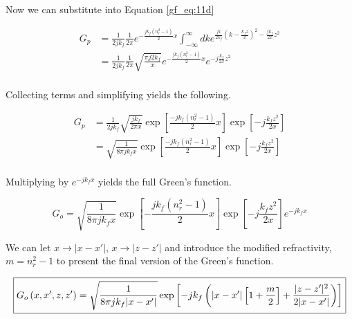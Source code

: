 \noindent Now we can substitute into Equation \ref{gf_eq:11d}

\begin{equation}
\begin{aligned}
G_p &= \frac{1}{2jk_f}\frac{1}{2\pi}e^{-\frac{jk_f(n_r^2-1)}{2}x}\int_{-\infty}^{\infty}dk e^{\frac{jx}{2k_f}\left(k  -\frac{k_fz}{x}\right)^2- \frac{jk_f}{2x}z^2 } \\
&= \frac{1}{2jk_f}\frac{1}{2\pi} \sqrt{\frac{\pi j2k_f}{x}}e^{-\frac{jk_f(n_r^2-1)}{2}x}e^{-j\frac{k_f}{2x}z^2 } \\
\end{aligned}
\label{gf_eq:11f}
\end{equation}
 \renewcommand{\baselinestretch}{2} \small\normalsize
 
\noindent Collecting terms and simplifying yields the following.

 \begin{equation}
\begin{aligned}
G_p &= \frac{1}{2jk_f}\sqrt{\frac{jk_f}{2\pi x}}\exp\left[\frac{-jk_f(n_r^2-1)}{2}x\right]\exp\left[-j\frac{k_fz^2}{2x} \right]\\
&= \sqrt{\frac{1}{8\pi j k_fx}}\exp\left[\frac{-jk_f(n_r^2-1)}{2}x\right]\exp\left[-j\frac{k_fz^2}{2x} \right]\\
\end{aligned}
\label{gf_eq:11ffa}
\end{equation}
 \renewcommand{\baselinestretch}{2} \small\normalsize
 
\noindent Multiplying by $e^{-jk_fx}$ yields the full Green's function.

\begin{equation}
G_o= \sqrt{\frac{1}{8\pi jk_fx}}\exp\left[-\frac{jk_f(n_r^2-1)}{2}x\right]\exp\left[-j\frac{k_fz^2}{2x} \right]e^{-jk_fx}
\label{gf_eq:11fa}
\end{equation}
  \renewcommand{\baselinestretch}{2} \small\normalsize
  
We can let $x\rightarrow |x-x'|$, $x\rightarrow |z-z'|$ and introduce the modified refractivity, $m = n_r^2-1$ to present the final version of the Green's function.

\begin{equation}
\boxed{G_o\left(x,x',z,z' \right)= \sqrt{\frac{1}{8\pi jk_f|x-x'|}}\exp\left[-jk_f\left(|x-x'|\left[1+\frac{m}{2}\right] + \frac{|z-z'|^2}{2|x-x'|}\right)\right]}\\
\label{gf_eq:11fb}
\end{equation}
 \renewcommand{\baselinestretch}{2} \small\normalsize
 
